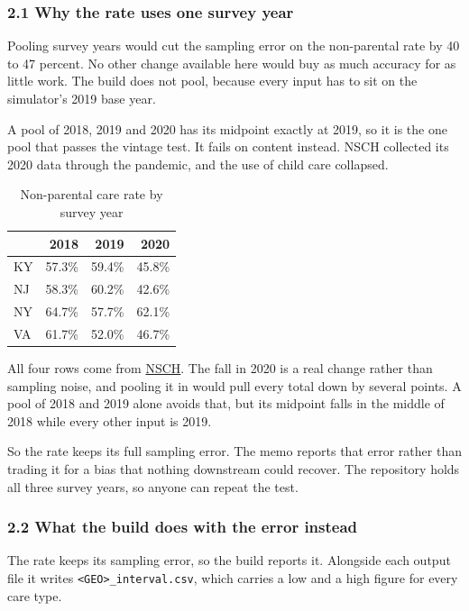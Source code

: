\documentclass[11pt]{article}
\begin{document}
\subsubsection*{2.1 Why the rate uses one survey year}

Pooling survey years would cut the sampling error on the non-parental rate by 40
to 47 percent. No other change available here would buy as much accuracy for as
little work. The build
does not pool, because every input has to sit on the simulator's 2019 base year.

A pool of 2018, 2019 and 2020 has its midpoint exactly at 2019, so it is the one pool
that passes the vintage test. It fails on content instead. NSCH collected its
2020 data through the pandemic, and the use of child care collapsed.

\begin{table}[H]
\centering
\caption{Non-parental care rate by survey year}
\begin{tabular}{L{1.6cm}rrr}
\toprule
& \textbf{2018} & \textbf{2019} & \textbf{2020} \\
\midrule
KY & 57.3\% & 59.4\% & 45.8\% \\
NJ & 58.3\% & 60.2\% & 42.6\% \\
NY & 64.7\% & 57.7\% & 62.1\% \\
VA & 61.7\% & 52.0\% & 46.7\% \\
\bottomrule
\end{tabular}
\end{table}

All four rows come from
\href{https://www.census.gov/programs-surveys/nsch/data/datasets.html}{NSCH}. The
fall in 2020 is a real change rather than sampling noise, and pooling it in would
pull every total down by several points. A pool of 2018 and 2019 alone avoids
that, but its midpoint falls in the middle of 2018 while every other input is 2019.

So the rate keeps its full sampling error. The memo reports that error rather
than trading it for a bias that nothing downstream could recover. The repository
holds all three survey years, so anyone can repeat the test.

\subsubsection*{2.2 What the build does with the error instead}

The rate keeps its sampling error, so the build reports it. Alongside each
output file it writes \texttt{<GEO>\_interval.csv}, which carries a low and a
high figure for every care type.
\end{document}

